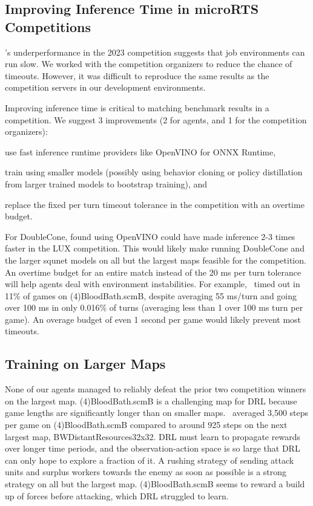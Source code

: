 \documentclass[conference]{IEEEtran}
\newcommand{\mapname}[1]{#1} %
\begin{document}
\subsection{Improving Inference Time in microRTS Competitions}
\agentName's underperformance in the 2023 competition suggests that job
environments can run slow. We worked with the competition
organizers to reduce the chance of timeouts. However, it was difficult to reproduce the same results as
the competition servers in our development environments.

Improving inference time is critical to matching benchmark results in a competition.
We suggest 3 improvements (2 for agents, and 1 for the competition organizers):
\begin{inparaenum}[(1)]
    \item use fast inference runtime providers like OpenVINO for ONNX Runtime,
    \item train using smaller models (possibly using behavior cloning or policy
    distillation from larger trained models to bootstrap training), and
    \item replace the fixed per turn timeout tolerance in the competition with an overtime
    budget.
\end{inparaenum}
For DoubleCone, \cite{Ferdinand2021doublecone} found using OpenVINO could have made
inference 2-3 times faster in the LUX competition. This would likely make running
DoubleCone and the larger squnet models on all but the largest maps feasible for the
competition. An overtime budget for an entire match instead of the 20 ms per turn
tolerance will help agents deal with environment instabilities. For example,
\bcPPOAgent\ timed out in 11\% of games on \mapname{(4)BloodBath.scmB}, despite
averaging 55 ms/turn and going over 100 ms in only 0.016\% of turns (averaging less than
1 over 100 ms turn per game). An overage budget of even 1 second per game would likely
prevent most timeouts.

\subsection{Training on Larger Maps}
None of our agents managed to reliably defeat the prior two competition winners on 
the largest map. \mapname{(4)BloodBath.scmB} is a challenging map for DRL because game 
lengths are significantly longer than on smaller
maps. \bcPPOAgent\ averaged 3,500 steps per game on
\mapname{(4)BloodBath.scmB} compared to around 925 steps on the next largest map,
\mapname{BWDistantResources32x32}. DRL must learn to propagate rewards over longer time
periods, and the observation-action space is so large that DRL can only hope to explore a
fraction of it. A rushing strategy of sending attack units and surplus workers towards
the enemy as soon as possible is a strong strategy on all but the largest map.
\mapname{(4)BloodBath.scmB} seems to reward a build up of forces before attacking, which
DRL struggled to learn.
\end{document}
